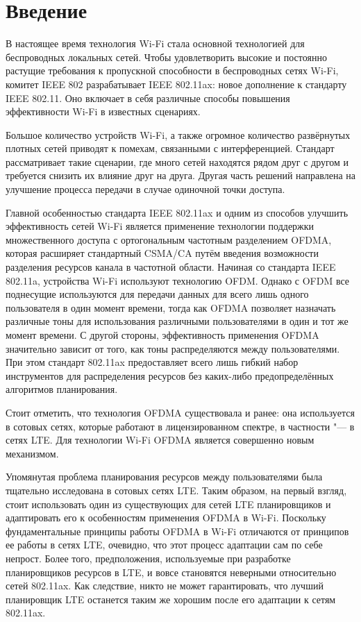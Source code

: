 \section*{Введение}
\label{sec:intro}

В настоящее время технология Wi-Fi стала основной технологией для беспроводных локальных сетей. Чтобы удовлетворить высокие и постоянно растущие требования к пропускной способности в беспроводных сетях Wi-Fi, комитет IEEE 802 разрабатывает IEEE 802.11ax: новое дополнение к стандарту IEEE 802.11. Оно включает в себя различные способы повышения эффективности Wi-Fi в известных сценариях. 

Большое количество устройств Wi-Fi, а также огромное количество развёрнутых плотных сетей приводят к помехам, связанными с интерференцией. Стандарт рассматривает такие сценарии, где много сетей находятся рядом друг с другом и требуется снизить их влияние друг на друга. Другая часть решений направлена на улучшение процесса передачи в случае одиночной точки доступа. 

Главной особенностью стандарта IEEE 802.11ax и одним из способов улучшить эффективность сетей Wi-Fi является применение технологии  поддержки множественного доступа с ортогональным частотным разделением OFDMA, которая расширяет стандартный CSMA/CA путём введения возможности разделения ресурсов канала в частотной области. 
Начиная со стандарта IEEE 802.11a, устройства Wi-Fi используют технологию OFDM.
Однако с OFDM все поднесущие используются для передачи данных для всего лишь одного пользователя в один момент времени, тогда как OFDMA позволяет назначать различные тоны для использования различными пользователями в один и тот же момент времени. 
С другой стороны, эффективность применения OFDMA значительно зависит от того, как тоны распределяются между пользователями. 
При этом стандарт 802.11ax предоставляет всего лишь гибкий набор инструментов для распределения ресурсов без каких-либо предопределённых алгоритмов планирования.
 
Стоит отметить, что технология OFDMA существовала и ранее: она используется в сотовых сетях, которые работают в лицензированном спектре, в частности "--- в сетях LTE. Для технологии Wi-Fi OFDMA является совершенно новым механизмом. 

Упомянутая проблема планирования ресурсов между пользователями была тщательно исследована в сотовых сетях LTE. 
Таким образом, на первый взгляд, стоит использовать один из существующих для сетей LTE планировщиков и адаптировать его к особенностям применения OFDMA в Wi-Fi. 
Поскольку фундаментальные принципы работы OFDMA в Wi-Fi отличаются от принципов ее работы в сетях LTE, очевидно, что этот процесс адаптации сам по себе непрост. Более того, предположения, используемые при разработке планировщиков ресурсов в LTE, и вовсе становятся неверными относительно сетей 802.11ax. 
Как следствие, никто не может гарантировать, что лучший планировщик LTE останется таким же хорошим после его адаптации к сетям 802.11ax. 


